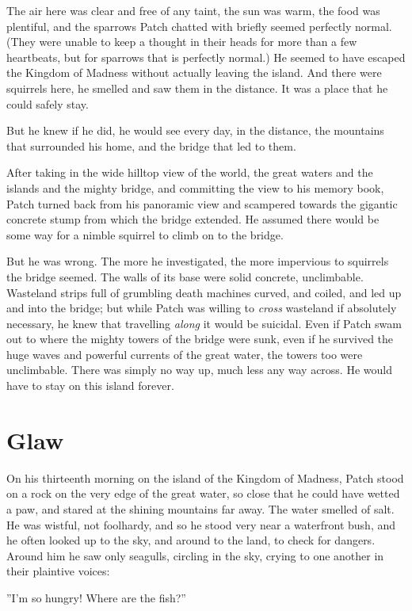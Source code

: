 \documentclass[12pt]{book}
\begin{document}
The air here was clear and free of any taint, the sun was warm, the food was plentiful, and the sparrows Patch chatted with briefly seemed perfectly normal. (They were unable to keep a thought in their heads for more than a few heartbeats, but for sparrows that is perfectly normal.) He seemed to have escaped the Kingdom of Madness without actually leaving the island. And there were squirrels here, he smelled and saw them in the distance. It was a place that he could safely stay.

But he knew if he did, he would see every day, in the distance, the mountains that surrounded his home, and the bridge that led to them.

After taking in the wide hilltop view of the world, the great waters and the islands and the mighty bridge, and committing the view to his memory book, Patch turned back from his panoramic view and scampered towards the gigantic concrete stump from which the bridge extended. He assumed there would be some way for a nimble squirrel to climb on to the bridge.

But he was wrong. The more he investigated, the more impervious to squirrels the bridge seemed. The walls of its base were solid concrete, unclimbable. Wasteland strips full of grumbling death machines curved, and coiled, and led up and into the bridge; but while Patch was willing to {\it cross} wasteland if absolutely necessary, he knew that travelling {\it along} it would be suicidal. Even if Patch swam out to where the mighty towers of the bridge were sunk, even if he survived the huge waves and powerful currents of the great water, the towers too were unclimbable. There was simply no way up, much less any way across. He would have to stay on this island forever.


\section{Glaw}

On his thirteenth morning on the island of the Kingdom of Madness, Patch stood on a rock on the very edge of the great water, so close that he could have wetted a paw, and stared at the shining mountains far away. The water smelled of salt. He was wistful, not foolhardy, and so he stood very near a waterfront bush, and he often looked up to the sky, and around to the land, to check for dangers. Around him he saw only seagulls, circling in the sky, crying to one another in their plaintive voices:

''I'm so hungry! Where are the fish?''
\end{document}
